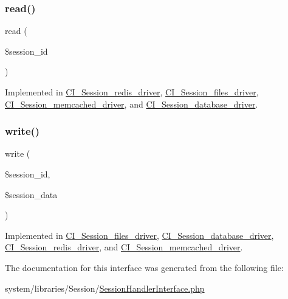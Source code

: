 \mbox{\label{interface_session_handler_interface_a5bbf84ebf657be4eaccc0582377c76bf}} 
\subsubsection{\texorpdfstring{read()}{read()}}
{\footnotesize\ttfamily read (\begin{DoxyParamCaption}\item[{}]{\$session\+\_\+id }\end{DoxyParamCaption})}



Implemented in \mbox{\hyperlink{class_c_i___session__redis__driver_a5bbf84ebf657be4eaccc0582377c76bf}{C\+I\+\_\+\+Session\+\_\+redis\+\_\+driver}}, \mbox{\hyperlink{class_c_i___session__files__driver_a5bbf84ebf657be4eaccc0582377c76bf}{C\+I\+\_\+\+Session\+\_\+files\+\_\+driver}}, \mbox{\hyperlink{class_c_i___session__memcached__driver_a5bbf84ebf657be4eaccc0582377c76bf}{C\+I\+\_\+\+Session\+\_\+memcached\+\_\+driver}}, and \mbox{\hyperlink{class_c_i___session__database__driver_a5bbf84ebf657be4eaccc0582377c76bf}{C\+I\+\_\+\+Session\+\_\+database\+\_\+driver}}.

\mbox{\label{interface_session_handler_interface_ad9d124885be93668f1dbf6aace5964f5}} 
\subsubsection{\texorpdfstring{write()}{write()}}
{\footnotesize\ttfamily write (\begin{DoxyParamCaption}\item[{}]{\$session\+\_\+id,  }\item[{}]{\$session\+\_\+data }\end{DoxyParamCaption})}



Implemented in \mbox{\hyperlink{class_c_i___session__files__driver_ad9d124885be93668f1dbf6aace5964f5}{C\+I\+\_\+\+Session\+\_\+files\+\_\+driver}}, \mbox{\hyperlink{class_c_i___session__database__driver_ad9d124885be93668f1dbf6aace5964f5}{C\+I\+\_\+\+Session\+\_\+database\+\_\+driver}}, \mbox{\hyperlink{class_c_i___session__redis__driver_ad9d124885be93668f1dbf6aace5964f5}{C\+I\+\_\+\+Session\+\_\+redis\+\_\+driver}}, and \mbox{\hyperlink{class_c_i___session__memcached__driver_ad9d124885be93668f1dbf6aace5964f5}{C\+I\+\_\+\+Session\+\_\+memcached\+\_\+driver}}.



The documentation for this interface was generated from the following file\+:\begin{DoxyCompactItemize}
\item 
system/libraries/\+Session/\mbox{\hyperlink{_session_handler_interface_8php}{Session\+Handler\+Interface.\+php}}\end{DoxyCompactItemize}
